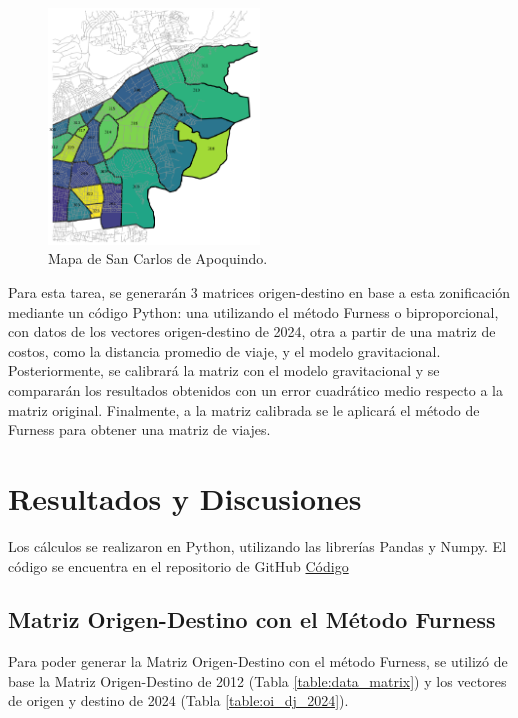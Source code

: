 \documentclass[letterpaper,12pt]{article}
\begin{document}
\begin{figure}[h!]
    \centering
    \includegraphics[width=0.5\textwidth]{fotos/mapa.png}
    \caption{Mapa de San Carlos de Apoquindo.}
    \label{fig:mapa}
\end{figure}

Para esta tarea, se generarán 3 matrices origen-destino en base a esta zonificación mediante un código Python: una utilizando el método Furness o biproporcional, con datos de los vectores origen-destino de 2024, otra a partir de una matriz de costos, como la distancia promedio de viaje, y el modelo gravitacional. Posteriormente, se calibrará la matriz con el modelo gravitacional y se compararán los resultados obtenidos con un error cuadrático medio respecto a la matriz original. Finalmente, a la matriz calibrada se le aplicará el método de Furness para obtener una matriz de viajes.

\newpage

\section{Resultados y Discusiones}
Los cálculos se realizaron en Python, utilizando las librerías Pandas y Numpy. El código se encuentra en el repositorio de GitHub \href{https://github.com/berckanala/T3_autitos/blob/main/t3.py}{Código}
\subsection{Matriz Origen-Destino con el Método Furness}
Para poder generar la Matriz Origen-Destino con el método Furness, se utilizó de base la Matriz Origen-Destino de 2012 (Tabla \ref{table:data_matrix}) y los vectores de origen y destino de 2024 (Tabla \ref{table:oi_dj_2024}). 
\end{document}
